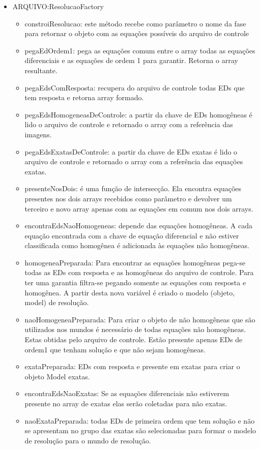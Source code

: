 \begin{itemize}
	\item ARQUIVO:ResolucaoFactory
	\begin{itemize}
		\item constroiResolucao: este método recebe como parâmetro o nome da fase para retornar o objeto com as equações possíveis do arquivo de controle 
		\item pegaEdOrdem1: pega as equações comum entre o array todas as equações diferenciais e as equações de ordem 1 para garantir. Retorna o array resultante.
		\item pegaEdsComResposta: recupera do arquivo de controle todas EDs que tem resposta e retorna array formado. 
		\item pegaEdsHomogeneasDeControle: a partir da chave de EDs homogêneas é lido o arquivo de controle e retornado o array com a referência das imagens.
		\item pegaEdsExatasDeControle: a partir da chave de EDs exatas é lido o arquivo de controle e retornado o array com a referência das equações exatas.
		\item presenteNosDois: é uma função de intersecção. Ela encontra equações presentes nos dois arrays recebidos como parâmetro e devolver um terceiro e novo array apenas com as equações em comum nos dois arrays. 
		\item encontraEdsNaoHomogeneas: depende das equações homogêneas. A cada equação encontrada com a chave de equação diferencial e não estiver classificada como homogênea é adicionada às equações não homogêneas.
		\item homogeneaPreparada: Para encontrar as equações homogêneas pega-se todas as EDs com resposta e as homogêneas do arquivo de controle. Para ter uma garantia filtra-se pegando somente as equações com resposta e homogênea. A partir desta nova variável é criado o modelo (objeto, model) de resolução. 
		\item naoHomogeneaPreparada: Para criar o objeto de não homogêneas que são utilizados nos mundos é necessário de todas equações não homogêneas. Estas obtidas pelo arquivo de controle. Estão presente apenas EDs de ordem1 que tenham solução e que não sejam homogêneas.  
		\item exataPreparada: EDs com resposta e presente em exatas para criar o objeto Model exatas.  
		\item encontraEdsNaoExatas: Se as equações diferenciais não estiverem presente no array de exatas elas serão coletadas para não exatas.  
		\item naoExataPreparada: todas EDs de primeira ordem que tem solução e não se apresentam no grupo das exatas são selecionadas para formar o modelo de resolução para o mundo de resolução.
	\end{itemize}
\end{itemize}


